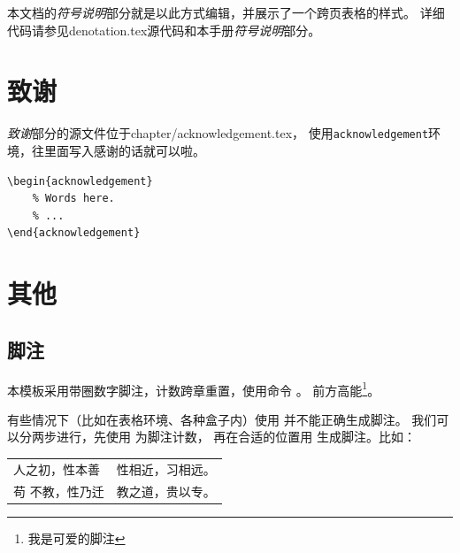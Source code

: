 	本文档的\emph{符号说明}部分就是以此方式编辑，并展示了一个跨页表格的样式。
	详细代码请参见\textsf{denotation.tex}源代码和本手册\emph{符号说明}部分。


\section{致谢}
	\emph{致谢}部分的源文件位于\textsf{chapter/acknowledgement.tex}，
	使用\texttt{acknowledgement}环境，往里面写入感谢的话就可以啦。
    \begin{lstlisting}
\begin{acknowledgement}
    % Words here.
    % ...
\end{acknowledgement}
    \end{lstlisting}


\section{其他}\label{sec:other}
    \subsection{脚注}
	本模板采用带圈数字脚注，计数跨章重置，使用命令 。
	前方高能\footnote{我是可爱的脚注}。

	有些情况下（比如在表格环境、各种盒子内）使用 并不能正确生成脚注。
	我们可以分两步进行，先使用  为脚注计数，
	再在合适的位置用  生成脚注。比如：
    \begin{table}[H]
        \centering
        \begin{tabular}{ll}
        \hline
            人之初，性本善 & 性相近，习相远。\\
            苟 \footnotemark 不教，性乃迁 & 教之道，贵以专。\\
        \hline
    \end{tabular}
    \end{table}

